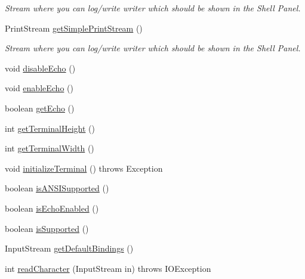 \begin{DoxyCompactItemize}
\begin{DoxyCompactList}\small\item\em Stream where you can log/write writer which should be shown in the Shell Panel. \end{DoxyCompactList}\item 
Print\+Stream \hyperlink{classgov_1_1nasa_1_1jpf_1_1inspector_1_1frontends_1_1jpfshell_1_1gui_1_1_swing_terminal_a2e5ba8df78cfa20c3ccaf3a9a833fbb0}{get\+Simple\+Print\+Stream} ()
\begin{DoxyCompactList}\small\item\em Stream where you can log/write writer which should be shown in the Shell Panel. \end{DoxyCompactList}\item 
void \hyperlink{classgov_1_1nasa_1_1jpf_1_1inspector_1_1frontends_1_1jpfshell_1_1gui_1_1_swing_terminal_a40dba8be74753302418c83d5c1245972}{disable\+Echo} ()
\item 
void \hyperlink{classgov_1_1nasa_1_1jpf_1_1inspector_1_1frontends_1_1jpfshell_1_1gui_1_1_swing_terminal_a1398efaccc29020bf03a22b942a447ae}{enable\+Echo} ()
\item 
boolean \hyperlink{classgov_1_1nasa_1_1jpf_1_1inspector_1_1frontends_1_1jpfshell_1_1gui_1_1_swing_terminal_a2fa28e265ca6c2f18c108b9ee6bf86f3}{get\+Echo} ()
\item 
int \hyperlink{classgov_1_1nasa_1_1jpf_1_1inspector_1_1frontends_1_1jpfshell_1_1gui_1_1_swing_terminal_abdfb6206b6f6ee60ee8a0c91d4b8f3f2}{get\+Terminal\+Height} ()
\item 
int \hyperlink{classgov_1_1nasa_1_1jpf_1_1inspector_1_1frontends_1_1jpfshell_1_1gui_1_1_swing_terminal_ad5e06bf82a85e255a22f066fc7e0abcb}{get\+Terminal\+Width} ()
\item 
void \hyperlink{classgov_1_1nasa_1_1jpf_1_1inspector_1_1frontends_1_1jpfshell_1_1gui_1_1_swing_terminal_aa40d313d8eff5a997ac299fc72e76e80}{initialize\+Terminal} ()  throws Exception 
\item 
boolean \hyperlink{classgov_1_1nasa_1_1jpf_1_1inspector_1_1frontends_1_1jpfshell_1_1gui_1_1_swing_terminal_a78f1bf6a4f47f3af7ff0cebb7d44c876}{is\+A\+N\+S\+I\+Supported} ()
\item 
boolean \hyperlink{classgov_1_1nasa_1_1jpf_1_1inspector_1_1frontends_1_1jpfshell_1_1gui_1_1_swing_terminal_aa1651743509508dfe37210790001dbca}{is\+Echo\+Enabled} ()
\item 
boolean \hyperlink{classgov_1_1nasa_1_1jpf_1_1inspector_1_1frontends_1_1jpfshell_1_1gui_1_1_swing_terminal_a56231b8e5153e0a6d993288a3cb027ef}{is\+Supported} ()
\item 
Input\+Stream \hyperlink{classgov_1_1nasa_1_1jpf_1_1inspector_1_1frontends_1_1jpfshell_1_1gui_1_1_swing_terminal_acd722999bd9f9929f4539ec6ec647c57}{get\+Default\+Bindings} ()
\item 
int \hyperlink{classgov_1_1nasa_1_1jpf_1_1inspector_1_1frontends_1_1jpfshell_1_1gui_1_1_swing_terminal_a8e0ad9dfcb0ad43c8f6ef3db2e05c8b5}{read\+Character} (Input\+Stream in)  throws I\+O\+Exception 
\end{DoxyCompactItemize}
